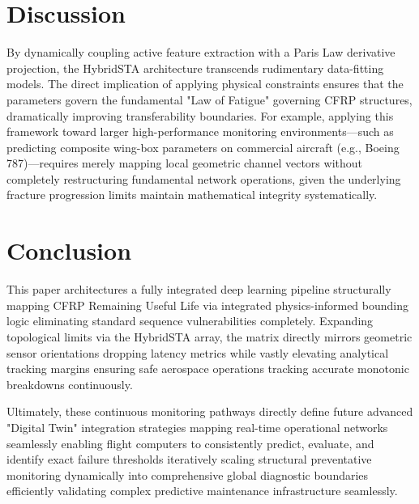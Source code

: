 \documentclass[conference]{IEEEtran}
\begin{document}
\section{Discussion}

By dynamically coupling active feature extraction with a Paris Law derivative projection, the HybridSTA architecture transcends rudimentary data-fitting models. The direct implication of applying physical constraints ensures that the parameters govern the fundamental "Law of Fatigue" governing CFRP structures, dramatically improving transferability boundaries. For example, applying this framework toward larger high-performance monitoring environments—such as predicting composite wing-box parameters on commercial aircraft (e.g., Boeing 787)—requires merely mapping local geometric channel vectors without completely restructuring fundamental network operations, given the underlying fracture progression limits maintain mathematical integrity systematically. 

\section{Conclusion}

This paper architectures a fully integrated deep learning pipeline structurally mapping CFRP Remaining Useful Life via integrated physics-informed bounding logic eliminating standard sequence vulnerabilities completely. Expanding topological limits via the HybridSTA array, the matrix directly mirrors geometric sensor orientations dropping latency metrics while vastly elevating analytical tracking margins ensuring safe aerospace operations tracking accurate monotonic breakdowns continuously.

Ultimately, these continuous monitoring pathways directly define future advanced "Digital Twin" integration strategies mapping real-time operational networks seamlessly enabling flight computers to consistently predict, evaluate, and identify exact failure thresholds iteratively scaling structural preventative monitoring dynamically into comprehensive global diagnostic boundaries efficiently validating complex predictive maintenance infrastructure seamlessly.
\end{document}
